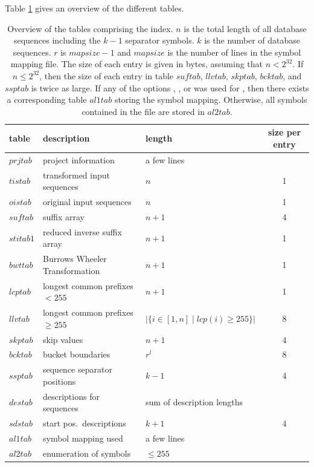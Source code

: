 \documentclass[12pt,titlepage]{article}
\newcommand{\LCP}[0]{\mathit{lcptab}}
\newcommand{\SUF}[0]{\mathit{suftab}}
\newcommand{\STI}[0]{\mathit{stitab}}
\newcommand{\STIone}[0]{\mathit{stitab1}}
\newcommand{\BCK}[0]{\mathit{bcktab}}
\newcommand{\PRJ}[0]{\mathit{prjtab}}
\newcommand{\TIS}[0]{\mathit{tistab}}
\newcommand{\OIS}[0]{\mathit{oistab}}
\newcommand{\BWT}[0]{\mathit{bwttab}}
\newcommand{\LLV}[0]{\mathit{llvtab}}
\newcommand{\SKP}[0]{\mathit{skptab}}
\newcommand{\ISO}[0]{\mathit{isotab}}
\newcommand{\SSP}[0]{\mathit{ssptab}}
\newcommand{\DES}[0]{\mathit{destab}}
\newcommand{\SDS}[0]{\mathit{sdstab}}
\begin{document}
Table \ref{TableOverview} gives an overview of the different tables.

\begin{table}
\caption{Overview of the tables comprising the index. $n$ is the total length 
of all database sequences including the $k-1$ separator symbols. 
$k$ is the number of database sequences. $r$ is $\mathit{mapsize}-1$ and
$\mathit{mapsize}$ is the number of lines in the symbol mapping file.
The size of each entry
is given in bytes, assuming that $n<2^{32}$. If $n\leq 2^{32}$, then
the size of each entry in table
$\SUF$, $\LLV$, $\SKP$, 
$\BCK$, and $\SSP$ is twice as large. If any of the options 
, , or  was used for
\MKV, then there exists a corresponding table $\mathit{al1tab}$ storing
the symbol mapping. Otherwise, all symbols contained in the file
are stored in $\mathit{al2tab}$.
}
\label{TableOverview}
\begin{center}
\begin{tabular}{|l|l|l|c|}\hline
table&description&length&size per entry\\\hline\hline
$\PRJ$&project information&a few lines&\\
$\TIS$&transformed input sequences&$n$&1\\
$\OIS$&original input sequences&$n$&1\\
$\SUF$&suffix array&$n+1$&4\\
$\STIone$&reduced inverse suffix array&$n+1$&1\\
$\BWT$&Burrows Wheeler Transformation&$n+1$&1\\
$\LCP$&longest common prefixes $<255$&$n+1$&1\\
$\LLV$&longest common prefixes $\geq 255$&$|\{i\in[1,n]\mid \mathit{lcp}(i)\geq 255\}|$&8\\
$\SKP$&skip values&$n+1$&4\\
$\BCK$&bucket boundaries&$r^{l}$&8\\
$\SSP$&sequence separator positions&$k-1$&4\\
$\DES$&descriptions for sequences&sum of description lengths&\\
$\SDS$&start pos.\ descriptions&$k+1$&4\\
$\mathit{al1tab}$&symbol mapping used&a few lines&\\
$\mathit{al2tab}$&enumeration of symbols&\(\leq 255\)&\\
\hline
\end{tabular}
\end{center}
\end{table}
\end{document}
